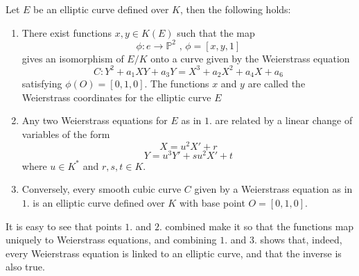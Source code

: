\begin{thm}
	Let $E$ be an elliptic curve defined over $K$, then the following holds:
	\begin{enumerate}
		\item There exist functions $x,y\in K(E)$ such that the map
		\begin{equation*}
		\phi:e\to\mathbb{P}^2\text{ , }\phi=[x,y,1]
		\end{equation*}
		gives an isomorphism of $E/K$ onto a curve given by the Weierstrass equation
		\begin{equation*}
		C:Y^2+a_1XY+a_3Y=X^3+a_2X^2+a_4X+a_6
		\end{equation*}
		satisfying $\phi(O)=[0,1,0]$. The functions $x$ and $y$ are called the Weierstrass coordinates for the elliptic curve $E$
		\item Any two Weierstrass equations for $E$ as in $1.$ are related by a linear change of variables of the form
		\begin{equation*}
		X=u^2X'+r
		\end{equation*}
		\begin{equation*}
		Y=u^3Y'+su^2X'+t
		\end{equation*}
		where $u\in K^*$ and $r,s,t\in K$.
		\item Conversely, every smooth cubic curve $C$ given by a Weierstrass equation as in $1.$ is an elliptic curve defined over $K$ with base point $O=[0,1,0]$.
	\end{enumerate}
\end{thm}

It is easy to see that points $1.$ and $2.$ combined make it so that the functions map uniquely to Weierstrass equations, and combining $1.$ and $3.$ shows that, indeed, every Weierstrass equation is linked to an elliptic curve, and that the inverse is also true.

